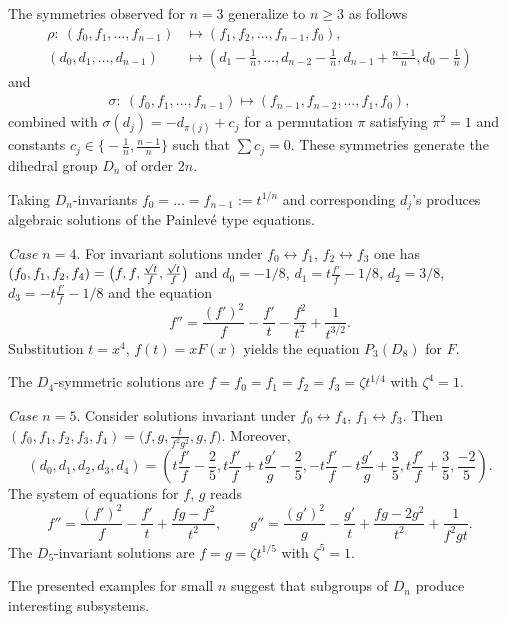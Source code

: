 \documentclass[pdftex]{sigma}
\numberwithin{equation}{section}
\begin{document}
 The symmetries observed for $n=3$ generalize to $n\geq 3$ as follows
\begin{align*}
\rho\colon\ (f_0, f_1,\dots, f_{n-1})
& \mapsto (f_1,f_2,\dots , f_{n-1},f_0),\\
(d_0,d_1,\dots, d_{n-1})& \mapsto \left(d_1-\frac1n, \dots,d_{n-2}-\frac1n,d_{n-1}+\frac{n-1}{n}, d_0-\frac1n\right)
\end{align*}
and
\begin{gather*}
\sigma\colon\ (f_0, f_1,\dots, f_{n-1})
\mapsto (f_{n-1}, f_{n-2},\dots, f_1, f_0),
\end{gather*}
combined with $\sigma(d_j)=-d_{\pi(j)}+c_j$ for a permutation $\pi$ satisfying $\pi^2=1$ and constants $c_j\in\bigl\{-\frac1n,\frac{n-1}{n}\bigr\}$
such that $\sum c_j=0$. These symmetries generate the dihedral group $D_n$ of order $2n$.

Taking $D_n$-invariants $f_0=\dots=f_{n-1}:=t^{1/n}$ and corresponding $d_j$'s produces algebraic solutions of the Painlev\'{e} type equations.



 {\it Case $n=4$}. For invariant solutions under
 $f_0\leftrightarrow f_1$, $f_2\leftrightarrow f_3$
 one has $(f_0,f_1,f_2,f_4)=\smash{\bigl(f,f,\frac{\sqrt{t}}{f}, \frac{\sqrt{t}}{f}\bigr)}$ and
 $d_0=-1/8$, $d_1=t\frac{f'}{f}-1/8$, $d_2=3/8$, $d_3=-t\frac{f'}{f}-1/8$ and the equation
 \[ f''=\frac{(f')^2}{f}-\frac{f'}{t}-\frac{f^2}{t^2}+\frac{1}{t^{3/2}}.\]
 Substitution $t=x^4$, $f(t)=xF(x)$ yields the equation $P_3(D_8)$ for $F$.

 The $D_4$-symmetric solutions are
 $f=f_0=f_1=f_2=f_3=\zeta t^{1/4}$ with $\zeta^4=1$.


 {\it Case $n=5$}. Consider solutions invariant under
 $f_0 \leftrightarrow f_4$, $f_1\leftrightarrow f_3$. Then
 $(f_0,f_1,f_2,f_3,f_4)=\bigl(f,g,\frac{t}{f^2g^2},g,f\bigr)$. Moreover,
 \[
 (d_0,d_1,d_2,d_3,d_4)=
\left(t\frac{f'}{f}-\frac25, t\frac{f'}{f}+t\frac{g'}{g}-\frac25, -t\frac{f'}{f}-t\frac{g'}{g}+\frac35, t\frac{f'}{f}+\frac35, \frac{-2}{5} \right).\]
The system of equations for $f$, $g$ reads
\[f''=\frac{(f')^2}{f}-\frac{f'}{t}+\frac{fg-f^2}{t^2},\qquad g''=\frac{(g')^2}{g}-\frac{g'}{t}+\frac{fg-2g^2}{t^2}+\frac{1}{f^2gt}. \]
The $D_5$-invariant solutions are $f=g=\zeta t^{1/5}$ with $\zeta^5=1$.

The presented examples for small $n$ suggest that
subgroups of $D_n$ produce interesting subsystems.
\end{document}
